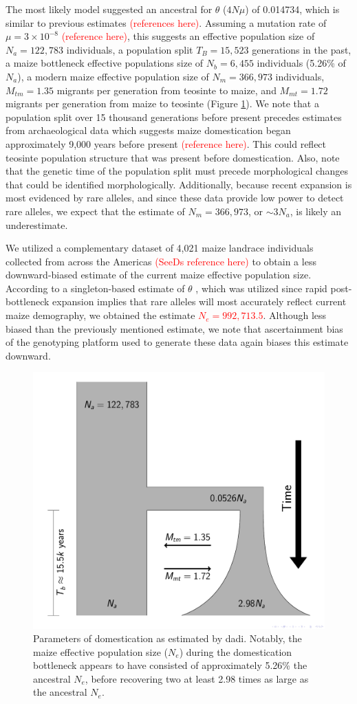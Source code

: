 \documentclass{pnastwo}
\begin{document}
\begin{article}
The most likely model suggested an ancestral for $\theta$ ($4N\mu$) of
0.014734, which is similar to previous estimates
\textcolor{red}{(references here)}. Assuming a mutation rate of $\mu =
3 \times 10^{-8}$ \textcolor{red}{(reference here)}, this suggests an effective
population size of $N_a = 122,783$ individuals, a population split
$T_B = 15,523$ generations in the past, a maize bottleneck
effective populations size of $N_b = 6,455$ individuals (5.26\% of
$N_a$), a modern maize effective population size of $N_m = 366,973$
individuals, $M_{tm} = 1.35$ migrants per generation from teosinte to
maize, and $M_{mt} = 1.72$ migrants per generation from maize to
teosinte (Figure \ref{fig:bottleneck}). We note that a population
split over 15 thousand generations before present precedes estimates
from
archaeological data which suggests maize domestication began
approximately 9,000 years before present \textcolor{red}{(reference
  here)}. This could reflect teosinte population structure that was present before
domestication. Also, note that the genetic time of the population
split must precede morphological changes that could be identified
morphologically.   Additionally, because recent expansion is
most evidenced by rare alleles, and since these data provide low
power to detect rare alleles, we expect that the estimate of  $N_m =
366,973$, or $\sim 3N_a$, is likely an underestimate.

We utilized a complementary dataset of 4,021 maize landrace individuals collected
from across the Americas \textcolor{red}{(SeeDs reference here)} to
obtain a less downward-biased estimate of the current maize effective
population size. According to a singleton-based estimate of $\theta$
\cite{fu1993}, which was utilized since rapid post-bottleneck expansion
implies that rare alleles will most accurately reflect current maize
demography, we obtained the estimate \textcolor{red}{$N_e =
  992,713.5$}. Although less biased than the previously mentioned
estimate, we note that ascertainment bias of the
genotyping platform used to generate these data again biases this
estimate downward.


\begin{figure}[b]
\centering
\includegraphics[width=.4\textwidth]{FigsAndFiles/DomesticationModel/domesticationModel.pdf}
\caption{Parameters of domestication as estimated by dadi. Notably,
  the maize effective population size ($N_e$) during the domestication
  bottleneck appears to have consisted of approximately 5.26\%
  the ancestral $N_e$, before recovering two at least 2.98
  times as large as the ancestral $N_e$. \label{fig:bottleneck} }
\end{figure}


\end{article}
\end{document}
